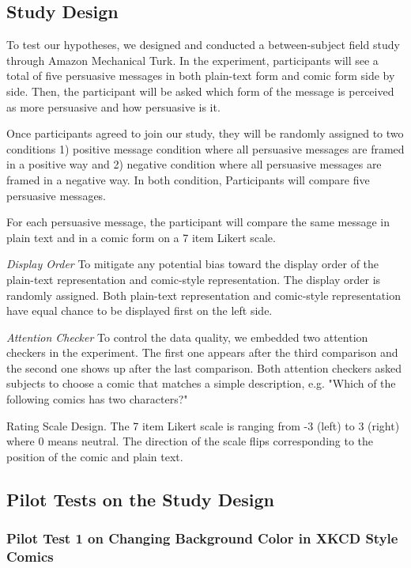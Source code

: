 \subsection{Study Design}
To test our hypotheses, we designed and conducted a between-subject field study through Amazon Mechanical Turk. In the experiment, participants will see a total of five persuasive messages in both plain-text form and comic form side by side. Then, the participant will be asked which form of the message is perceived as more persuasive and how persuasive is it.\par
Once participants agreed to join our study, they will be randomly assigned to two conditions 1) positive message condition where all persuasive messages are framed in a positive way and 2) negative condition where all persuasive messages are framed in a negative way. In both condition, Participants will compare five persuasive messages.\par
For each persuasive message, the participant will compare the same message in plain text and in a comic form on a 7 item Likert scale. \par
\textit{Display Order} To mitigate any potential bias toward the display order of the plain-text representation and comic-style representation. The display order is randomly assigned. Both plain-text representation and comic-style representation have equal chance to be displayed first on the left side.\par
\textit{Attention Checker} To control the data quality, we embedded two attention checkers in the experiment. The first one appears after the third comparison and the second one shows up after the last comparison. Both attention checkers asked subjects to choose a comic that matches a simple description, e.g. "Which of the following comics has two characters?"\par
Rating Scale Design. The 7 item Likert scale is ranging from -3 (left) to 3 (right) where 0 means neutral. The direction of the scale flips corresponding to the position of the comic and plain text. \par
\subsection{Pilot Tests on the Study Design}
\subsubsection{Pilot Test 1 on Changing Background Color in XKCD Style Comics}
